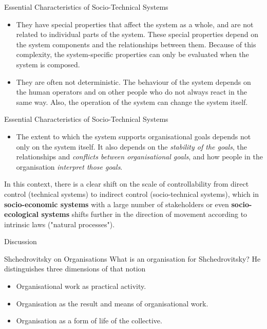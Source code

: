 \documentclass{beamer}
\begin{document}
\begin{frame}{Essential Characteristics of Socio-Technical Systems}
\begin{itemize}
\item They have special properties that affect the system as a whole, and are
  not related to individual parts of the system. These special properties
  depend on the system components and the relationships between them. Because
  of this complexity, the system-specific properties can only be evaluated
  when the system is composed.\medskip
\item They are often not deterministic. The behaviour of the system depends on
  the human operators and on other people who do not always react in the same
  way. Also, the operation of the system can change the system itself.
\end{itemize}
\end{frame}

\begin{frame}{Essential Characteristics of Socio-Technical Systems}
\begin{itemize}
\item The extent to which the system supports organisational goals depends not
  only on the system itself. It also depends on the \emph{stability of the
    goals}, the relationships and \emph{conflicts between organisational
    goals}, and how people in the organisation \emph{interpret those goals}.
\end{itemize}

In this context, there is a clear shift on the scale of controllability from
direct control (technical systems) to indirect control (socio-technical
systems), which in \textbf{socio-economic systems} with a large number of
stakeholders or even \textbf{socio-ecological systems} shifts further in the
direction of movement according to intrinsic laws ("natural processes").

\begin{center}\Large Discussion  \end{center}
  \end{frame}

\begin{frame}{Shchedrovitsky on Organisations}
What is an organisation for Shchedrovitsky? He distinguishes three dimensions
of that notion
\begin{itemize}
\item Organisational work as practical activity.
\item Organisation as the result and means of organisational work.
\item Organisation as a form of life of the collective.
\end{itemize}

\end{frame}
\end{document}
